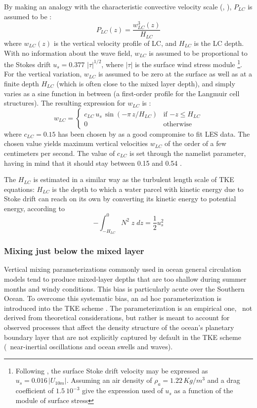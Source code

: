 \documentclass[../main/NEMO_manual]{subfiles}
\begin{document}
By making an analogy with the characteristic convective velocity scale (\eg, \citet{dalessio.abdella.ea_JPO98}),
$P_{LC}$ is assumed to be :
\[
P_{LC}(z) = \frac{w_{LC}^3(z)}{H_{LC}}
\]
where $w_{LC}(z)$ is the vertical velocity profile of LC, and $H_{LC}$ is the LC depth.
With no information about the wave field, $w_{LC}$ is assumed to be proportional to
the Stokes drift $u_s = 0.377\,\,|\tau|^{1/2}$, where $|\tau|$ is the surface wind stress module
\footnote{Following \citet{li.garrett_JMR93}, the surface Stoke drift velocity may be expressed as
  $u_s =  0.016 \,|U_{10m}|$.
  Assuming an air density of $\rho_a=1.22 \,Kg/m^3$ and a drag coefficient of
  $1.5~10^{-3}$ give the expression used of $u_s$ as a function of the module of surface stress
}.
For the vertical variation, $w_{LC}$ is assumed to be zero at the surface as well as at
a finite depth $H_{LC}$ (which is often close to the mixed layer depth),
and simply varies as a sine function in between (a first-order profile for the Langmuir cell structures).
The resulting expression for $w_{LC}$ is :
\[
  w_{LC}  =
  \begin{cases}
    c_{LC} \,u_s \,\sin(- \pi\,z / H_{LC} )    &      \text{if $-z \leq H_{LC}$} 	\\
    0                 				 &      \text{otherwise}
  \end{cases}
\]
where $c_{LC} = 0.15$ has been chosen by \citep{axell_JGR02} as a good compromise to fit LES data.
The chosen value yields maximum vertical velocities $w_{LC}$ of the order of a few centimeters per second.
The value of $c_{LC}$ is set through the  namelist parameter,
having in mind that it should stay between 0.15 and 0.54 \citep{axell_JGR02}.

The $H_{LC}$ is estimated in a similar way as the turbulent length scale of TKE equations:
$H_{LC}$ is the depth to which a water parcel with kinetic energy due to Stoke drift can reach on its own by
converting its kinetic energy to potential energy, according to
\[
- \int_{-H_{LC}}^0 { N^2\;z  \;dz} = \frac{1}{2} u_s^2
\]

\subsubsection{Mixing just below the mixed layer}

Vertical mixing parameterizations commonly used in ocean general circulation models tend to
produce mixed-layer depths that are too shallow during summer months and windy conditions.
This bias is particularly acute over the Southern Ocean.
To overcome this systematic bias, an ad hoc parameterization is introduced into the TKE scheme \cite{rodgers.aumont.ea_B14}.
The parameterization is an empirical one, \ie\ not derived from theoretical considerations,
but rather is meant to account for observed processes that affect the density structure of
the ocean’s planetary boundary layer that are not explicitly captured by default in the TKE scheme
(\ie\ near-inertial oscillations and ocean swells and waves).
\end{document}
